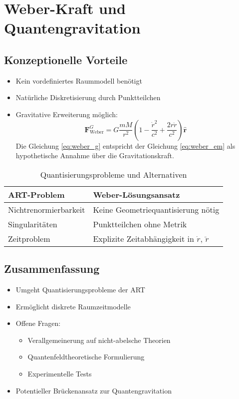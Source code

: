 \section{Weber-Kraft und Quantengravitation}

\subsection{Konzeptionelle Vorteile}
\begin{itemize}[leftmargin=*,noitemsep]
    \item Kein vordefiniertes Raummodell benötigt
    \item Natürliche Diskretisierung durch Punktteilchen
    \item Gravitative Erweiterung möglich:
    \begin{equation}\label{eq:weber_g}
    \bm{F}_{\text{Weber}}^{G} = G\frac{mM}{r^2}\left(1 - \frac{\dot{r}^2}{c^2} + \frac{2r\ddot{r}}{c^2}\right)\bm{\hat{r}}
    \end{equation}
    Die Gleichung \ref{eq:weber_g} entspricht der Gleichung \ref{eq:weber_em} als hypothetische Annahme über die Gravitationskraft.
\end{itemize}

\begin{table}[h]
\centering
\caption{Quantisierungsprobleme und Alternativen}
\begin{tabularx}{\linewidth}{lX}
\toprule
\textbf{ART-Problem} & \textbf{Weber-Lösungsansatz} \\
\midrule
Nichtrenormierbarkeit & Keine Geometriequantisierung nötig \\
Singularitäten & Punktteilchen ohne Metrik \\
Zeitproblem & Explizite Zeitabhängigkeit in $\dot{r}$, $\ddot{r}$ \\
\bottomrule
\end{tabularx}
\end{table}

\subsection*{Zusammenfassung}
\begin{itemize}[leftmargin=*,noitemsep]
    \item Umgeht Quantisierungsprobleme der ART
    \item Ermöglicht diskrete Raumzeitmodelle
    \item Offene Fragen:
    \begin{itemize}[noitemsep]
        \item Verallgemeinerung auf nicht-abelsche Theorien
        \item Quantenfeldtheoretische Formulierung
        \item Experimentelle Tests
    \end{itemize}
    \item Potentieller Brückenansatz zur Quantengravitation
\end{itemize}

